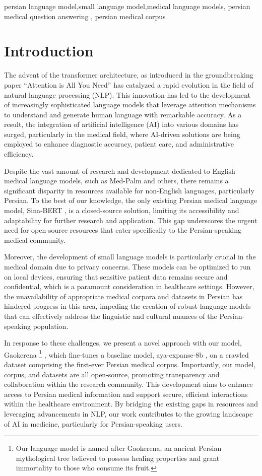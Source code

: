 \documentclass[conference]{IEEEtran}
\begin{document}
\begin{IEEEkeywords}
persian language model,small language model,medical language models, persian medical question answering , persian medical corpus
\end{IEEEkeywords}

\section{Introduction}
The advent of the transformer architecture, as introduced in the groundbreaking paper “Attention is All You Need”
\cite{b1}
has catalyzed a rapid evolution in the field of natural language processing (NLP). This innovation has led to the development of increasingly sophisticated language models that leverage attention mechanisms to understand and generate human language with remarkable accuracy. As a result, the integration of artificial intelligence (AI) into various domains has surged, particularly in the medical field, where AI-driven solutions are being employed to enhance diagnostic accuracy, patient care, and administrative efficiency.

Despite the vast amount of research and development dedicated to English medical language models, such as Med-Palm
\cite{b2} \cite{b3}
and others, there remains a significant disparity in resources available for non-English languages, particularly Persian. To the best of our knowledge, the only existing Persian medical language model, Sina-BERT
\cite{b4}
, is a closed-source solution, limiting its accessibility and adaptability for further research and application. This gap underscores the urgent need for open-source resources that cater specifically to the Persian-speaking medical community.

Moreover, the development of small language models is particularly crucial in the medical domain due to privacy concerns. These models can be optimized to run on local devices, ensuring that sensitive patient data remains secure and confidential, which is a paramount consideration in healthcare settings. However, the unavailability of appropriate medical corpora and datasets in Persian has hindered progress in this area, impeding the creation of robust language models that can effectively address the linguistic and cultural nuances of the Persian-speaking population.

In response to these challenges, we present a novel approach with our model, Gaokerena
\footnote{
Our language model is named after Gaokerena, an ancient Persian mythological tree believed to possess healing properties and grant immortality to those who consume its fruit.
}
, which fine-tunes a baseline model, aya-expanse-8b
\cite{b5}
, on a crawled dataset comprising the first-ever Persian medical corpus. Importantly, our model, corpus, and datasets are all open-source, promoting transparency and collaboration within the research community. This development aims to enhance access to Persian medical information and support secure, efficient interactions within the healthcare environment. By bridging the existing gaps in resources and leveraging advancements in NLP, our work contributes to the growing landscape of AI in medicine, particularly for Persian-speaking users.
\end{document}
